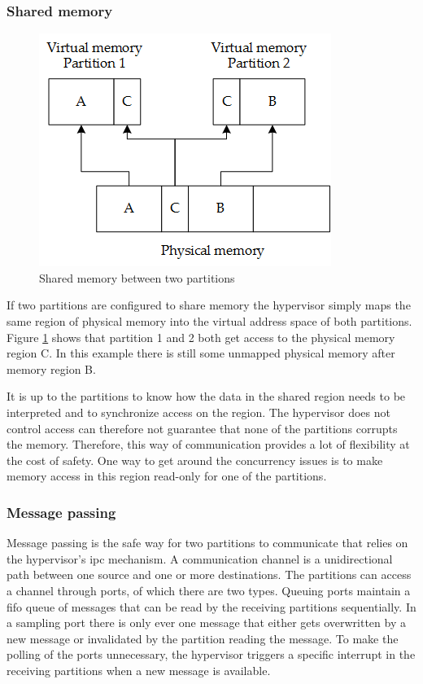 \subsubsection{Shared memory}
\begin{figure}[hbt!]
\centering
\includegraphics[scale=0.75]{Figures/shared_memory.png}
\decoRule
\caption{Shared memory between two partitions}
\label{fig:shared_memory}
\end{figure}
If two partitions are configured to share memory the hypervisor simply maps the same region of physical memory into the virtual address space of both partitions. Figure \ref{fig:shared_memory} shows that partition 1 and 2 both get access to the physical memory region C. In this example there is still some unmapped physical memory after memory region B. 

It is up to the partitions to know how the data in the shared region needs to be interpreted and to synchronize access on the region. The hypervisor does not control access can therefore not guarantee that none of the partitions corrupts the memory. Therefore, this way of communication provides a lot of flexibility at the cost of safety.
One way to get around the concurrency issues is to make memory access in this region read-only for one of the partitions.

\subsubsection{Message passing}
Message passing is the safe way for two partitions to communicate that relies on the hypervisor's \acrshort{ipc} mechanism. A communication channel is a unidirectional path between one source and one or more destinations. The partitions can access a channel through ports, of which there are two types. Queuing ports maintain a \acrshort{fifo} queue of messages that can be read by the receiving partitions sequentially. In a sampling port there is only ever one message that either gets overwritten by a new message or invalidated by the partition reading the message. To make the polling of the ports unnecessary, the hypervisor triggers a specific interrupt in the receiving partitions when a new message is available.

